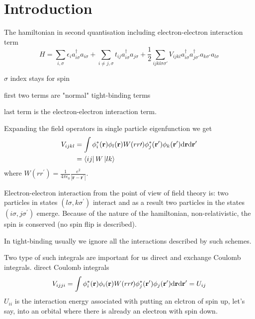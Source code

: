 \section{Introduction}
\par{The hamiltonian in second quantisation including electron-electron interaction term}
\begin{equation}
H=\sum_{i,\sigma}\epsilon_ia_{i\sigma}^{\dag}a_{i\sigma}+\sum_{i\neq j,\sigma}t_{ij}a_{i\sigma}^{\dag}a_{j\sigma}+\frac{1}{2}\sum_{ijkl\sigma \sigma{\prime}}
V_{ijkl}a_{i\sigma}^{\dag}a_{j\sigma\prime}^{\dag}a_{k\sigma\prime}a_{l\sigma}
\end{equation}
\par{$\sigma$ index stays for spin}
\par{first two terms are "normal" tight-binding terms}
\par{last term is the electron-electron interaction term.}
\par{Expanding the field operators in single particle eigenfunction we get}
\begin{equation}
\begin{split}
V_{ijkl}&=\int\phi_{i}^{*}({\bf r})\phi_{l}({\bf r})W(rr\prime)\phi_{j}^{*}({\bf r^\prime})\phi_{k}({\bf r^\prime})\text{d}{\bf r}\text{d}{\bf r^\prime}\\
&=\mathinner{\langle{ij}|}W\mathinner{|{lk}\rangle}
\end{split}
\end{equation}
where $W(rr^\prime)=\frac{1}{4\pi\epsilon_0}\frac{e^2}{|\bm{r}-\bm{r^\prime}|}$.
\par{Electron-electron interaction from the point of view of field theory is: two particles in states $(l\sigma,k\sigma^\prime)$ interact and as a result two particles 
in the states $(i\sigma,j\sigma^\prime)$ emerge. Because of the nature of the hamiltonian, non-relativistic, the spin is conserved (no spin flip is described).}
\par{In tight-binding usually we ignore all the interactions described by such schemes.}
\par{Two type of such integrals are important for us direct and exchange Coulomb integrals.}
direct Coulomb integrals
\begin{equation}
\label{udef}
V_{ijji}=\int\phi_{i}^{*}({\bf r})\phi_{i}({\bf r})W(rr\prime)\phi_{j}^{*}({\bf r^\prime})\phi_{j}({\bf r^\prime})\text{d}{\bf r}\text{d}{\bf r^\prime}=U_{ij}
\end{equation}
$U_{ii}$ is the interaction energy associated with putting an elctron of spin up, let's say, into an orbital where there is already an electron with spin down.\\
